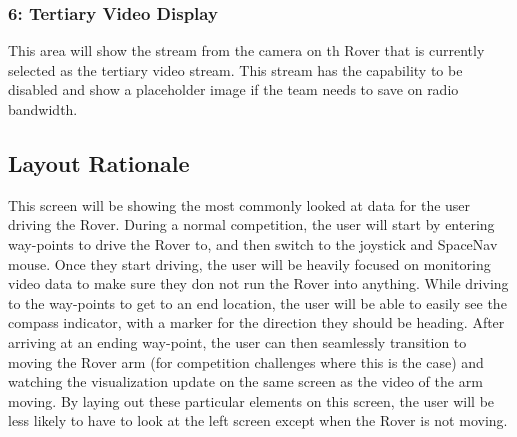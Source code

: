 \subsubsection{6: Tertiary Video Display}
This area will show the stream from the camera on th Rover that is currently selected as the tertiary video stream.
This stream has the capability to be disabled and show a placeholder image if the team needs to save on radio bandwidth.


\subsection{Layout Rationale}
This screen will be showing the most commonly looked at data for the user driving the Rover.
During a normal competition, the user will start by entering way-points to drive the Rover to, and then switch to the joystick and SpaceNav mouse.
Once they start driving, the user will be heavily focused on monitoring video data to make sure they don not run the Rover into anything. 
While driving to the way-points to get to an end location, the user will be able to easily see the compass indicator, with a marker for the direction they should be heading.
After arriving at an ending way-point, the user can then seamlessly transition to moving the Rover arm (for competition challenges where this is the case) and watching the visualization update on the same screen as the video of the arm moving.
By laying out these particular elements on this screen, the user will be less likely to have to look at the left screen except when the Rover is not moving.
